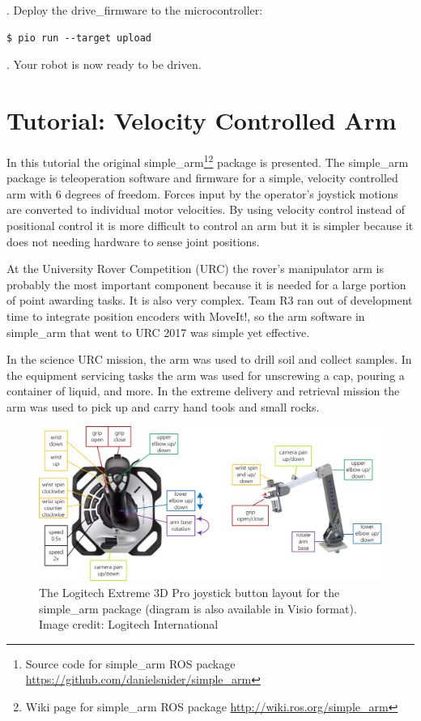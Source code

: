 \documentclass[runningheads,a4paper]{llncs}
\begin{document}
. Deploy the drive\_firmware to the microcontroller:

\begin{lstlisting}[frame=single,basicstyle=\ttfamily\footnotesize]
$ pio run --target upload
\end{lstlisting}

. Your robot is now ready to be driven.

\section{Tutorial: Velocity Controlled Arm}\label{arm}

In this tutorial the original simple\_arm\footnote{Source code for simple\_arm ROS package \url{https://github.com/danielsnider/simple_arm}}\footnote{Wiki page for simple\_arm ROS package \url{http://wiki.ros.org/simple_arm}} package is presented. The simple\_arm package is teleoperation software and firmware for a simple, velocity controlled arm with 6 degrees of freedom. Forces input by the operator's joystick motions are converted to individual motor velocities. By using velocity control instead of positional control it is more difficult to control an arm but it is simpler because it does not needing hardware to sense joint positions.

At the University Rover Competition (URC) the rover's manipulator arm is probably the most important component because it is needed for a large portion of point awarding tasks. It is also very complex. Team R3 ran out of development time to integrate position encoders with MoveIt!, so the arm software in simple\_arm that went to URC 2017 was simple yet effective.

In the science URC mission, the arm was used to drill soil and collect samples. In the equipment servicing tasks the arm was used for unscrewing a cap, pouring a container of liquid, and more. In the extreme delivery and retrieval mission the arm was used to pick up and carry hand tools and small rocks.

\begin{figure}
\centering
\includegraphics[width=\textwidth]{simple_arm_joystick_diagram}
\caption{The Logitech Extreme 3D Pro joystick button layout for the simple\_arm package (diagram is also available in Visio format\protect\footnotemark). Image credit: Logitech International}
\label{fig:simple_arm_joystick_diagram}
\end{figure}
\end{document}
